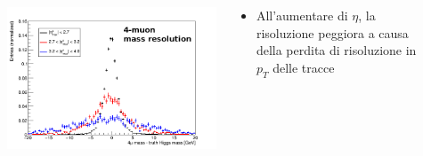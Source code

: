 \documentclass{beamer}
\begin{document}
\begin{frame}
\begin{columns}
\begin{column}{0.09\textwidth}
\end{column}
\begin{column}{0.41\textwidth}
\includegraphics[width=\textwidth]{HZZ4mu/sigRecoMass2}
\end{column}
\begin{column}{0.41\textwidth}
\begin{itemize}
\item \small All'aumentare di $\eta$, la risoluzione peggiora a causa della perdita
di risoluzione in $p_{T}$ delle tracce
\end{itemize}
\end{column}
\begin{column}{0.09\textwidth}
\end{column}
\end{columns}

\end{frame}
\end{document}
